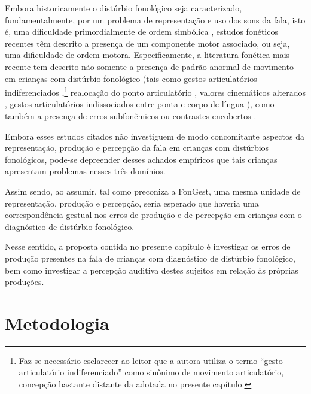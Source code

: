 \documentclass[output=paper,colorlinks,citecolor=brown,booklanguage=portuguese]{langscibook}
\begin{document}
Embora historicamente o distúrbio fonológico seja caracterizado, fundamentalmente, por um problema de representação e uso dos sons da fala, isto é, uma dificuldade primordialmente de ordem simbólica \citep{Ingram1997}, estudos fonéticos recentes têm descrito a presença de um componente motor associado, ou seja, uma dificuldade de ordem motora. Especificamente, a literatura fonética mais recente tem descrito não somente a presença de padrão anormal de movimento em crianças com distúrbio fonológico (tais como gestos articulatórios indiferenciados \citep{Gibbon1999},\footnote{Faz-se necessário esclarecer ao leitor que a autora utiliza o termo “gesto articulatório indiferenciado” como sinônimo de movimento articulatório, concepção bastante distante da adotada no presente capítulo.} realocação do ponto articulatório \citep{Gibbon2002}, valores cinemáticos alterados \citep{Goozee2007}, gestos articulatórios indissociados entre ponta e corpo de língua \citep{Oliveira2018}), como também a presença de erros subfonêmicos ou contrastes encobertos \citep{Scobbie2000, Munson2010, Berti2016}.

Embora esses estudos citados não investiguem de modo concomitante aspectos da representação, produção e percepção da fala em crianças com distúrbios fonológicos, pode-se depreender desses achados empíricos que tais crianças apresentam problemas nesses três domínios.

Assim sendo, ao assumir, tal como preconiza a FonGest, uma mesma unidade de representação, produção e percepção, seria esperado que haveria uma correspondência gestual nos erros de produção e de percepção em crianças com o diagnóstico de distúrbio fonológico.

Nesse sentido, a proposta contida no presente capítulo é investigar os erros de produção presentes na fala de crianças com diagnóstico de distúrbio fonológico, bem como investigar a percepção auditiva destes sujeitos em relação às próprias produções.

\section{Metodologia}
\end{document}

